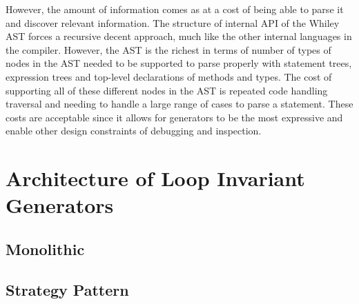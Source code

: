 However, the amount of information comes as at a cost of being able to parse
it and discover relevant information.
The structure of internal API of the Whiley AST forces a recursive decent
approach, much like the other internal languages in the compiler.
However, the AST is the richest in terms of number of types of nodes
in the AST needed to be supported to parse properly with
statement trees, expression trees and top-level declarations of methods and
types.
The cost of supporting all of these different nodes in the AST is
repeated code handling traversal and needing to handle a large range
of cases to parse a statement.
These costs are acceptable since it allows for generators to be
the most expressive and enable other design constraints of
debugging and inspection.

\section{Architecture of Loop Invariant Generators}

\subsection{Monolithic}

\subsection{Strategy Pattern}

